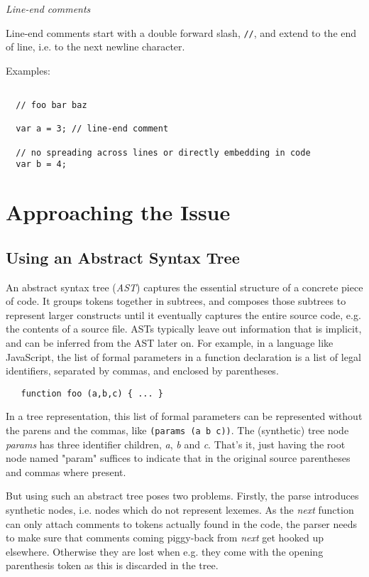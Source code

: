 \documentclass[11pt,a4paper]{article}
\begin{document}
\textit{Line-end comments}

Line-end comments start with a double forward slash, \texttt{//}, and extend to
the end of line, i.e. to the next newline character.

Examples:

\begin{verbatim}

  // foo bar baz
  
  var a = 3; // line-end comment

  // no spreading across lines or directly embedding in code
  var b = 4;

\end{verbatim}

\section{Approaching the Issue}

\subsection{Using an Abstract Syntax Tree}

An abstract syntax tree (\emph{AST}) captures the essential structure of a
concrete piece of code. It groups tokens together in subtrees, and composes
those subtrees to represent larger constructs until it eventually captures the
entire source code, e.g. the contents of a source file. ASTs typically leave out
information that is implicit, and can be inferred from the AST later on. For
example, in a language like JavaScript, the list of formal parameters in a
function declaration is a list of legal identifiers, separated by commas, and
enclosed by parentheses.

\begin{verbatim}
   function foo (a,b,c) { ... }
\end{verbatim}

In a tree representation, this list of formal parameters can be represented
without the parens and the commas, like \texttt{(params (a b c))}. The
(synthetic) tree node \emph{params} has three identifier children, \emph{a},
\emph{b} and \emph{c}. That's it, just having the root node named "param"
suffices to indicate that in the original source parentheses and commas where
present.

But using such an abstract tree poses two problems. Firstly, the parse
introduces synthetic nodes, i.e. nodes which do not represent lexemes. As the
\emph{next} function can only attach comments to tokens actually found in the
code, the parser needs to make sure that comments coming piggy-back from
\emph{next} get hooked up elsewhere. Otherwise they are lost when e.g. they come
with the opening parenthesis token as this is discarded in the tree.
\end{document}
